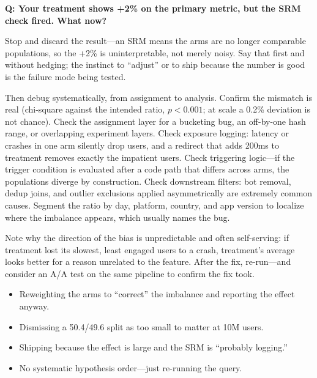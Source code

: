 \begin{interviewq}
\textbf{Q: Your treatment shows +2\% on the primary metric, but the SRM check fired. What now?}

 \quad {} \quad \badgefreq{\freqhigh}

\stronganswer

Stop and discard the result---an SRM means the arms are no longer comparable populations, so the +2\% is uninterpretable, not merely noisy. Say that first and without hedging; the instinct to ``adjust'' or to ship because the number is good is the failure mode being tested.

Then debug systematically, from assignment to analysis. Confirm the mismatch is real (chi-square against the intended ratio, $p < 0.001$; at scale a 0.2\% deviation is not chance). Check the assignment layer for a bucketing bug, an off-by-one hash range, or overlapping experiment layers. Check exposure logging: latency or crashes in one arm silently drop users, and a redirect that adds 200ms to treatment removes exactly the impatient users. Check triggering logic---if the trigger condition is evaluated after a code path that differs across arms, the populations diverge by construction. Check downstream filters: bot removal, dedup joins, and outlier exclusions applied asymmetrically are extremely common causes. Segment the ratio by day, platform, country, and app version to localize where the imbalance appears, which usually names the bug.

Note why the direction of the bias is unpredictable and often self-serving: if treatment lost its slowest, least engaged users to a crash, treatment's average looks better for a reason unrelated to the feature. After the fix, re-run---and consider an A/A test on the same pipeline to confirm the fix took.

\redflags
\begin{itemize}
    \item Reweighting the arms to ``correct'' the imbalance and reporting the effect anyway.
    \item Dismissing a 50.4/49.6 split as too small to matter at 10M users.
    \item Shipping because the effect is large and the SRM is ``probably logging.''
    \item No systematic hypothesis order---just re-running the query.
\end{itemize}



\end{interviewq}
